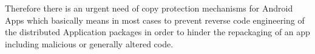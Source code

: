 
Therefore there is an urgent need of copy protection mechanisms
for Android Apps which basically means in most cases to prevent reverse code engineering of the distributed Application packages in order to hinder the repackaging of an app including malicious or generally altered code. 
